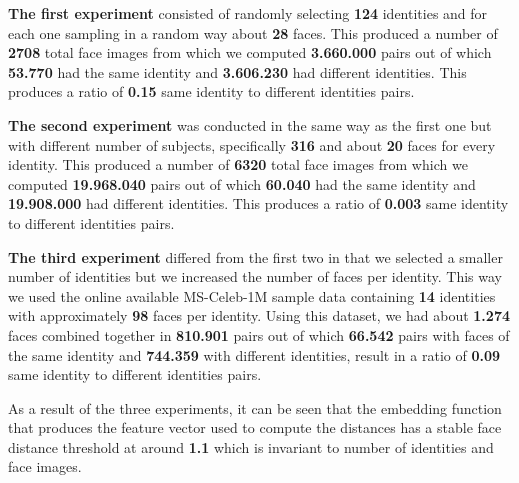 \textbf{The first experiment} consisted of randomly selecting \textbf{124} identities and for each one sampling in a random way about \textbf{28} faces. This produced a number of \textbf{2708} total face images from which we computed \textbf{3.660.000} pairs out of which \textbf{53.770} had the same identity and \textbf{3.606.230} had different identities. This produces a ratio of \textbf{0.15} same identity to different identities pairs.

\textbf{The second experiment} was conducted in the same way as the first one but with different number of subjects, specifically \textbf{316} and about \textbf{20} faces for every identity. This produced a number of \textbf{6320} total face images from which we computed \textbf{19.968.040} pairs out of which \textbf{60.040} had the same identity and \textbf{19.908.000} had different identities. This produces a ratio of \textbf{0.003} same identity to different identities pairs.

\textbf{The third experiment} differed from the first two in that we selected a smaller number of identities but we increased the number of faces per identity. This way we used the online available MS-Celeb-1M sample data containing \textbf{14} identities with approximately \textbf{98} faces per identity. Using this dataset, we had about \textbf{1.274} faces combined together in \textbf{810.901} pairs out of which \textbf{66.542} pairs with faces of the same identity and \textbf{744.359} with different identities, result in a ratio of \textbf{0.09} 	same identity to different identities pairs.

As a result of the three experiments, it can be seen that the embedding function that produces the feature vector used to compute the distances has a stable face distance threshold at around \textbf{1.1} which is invariant to number of identities and face images.